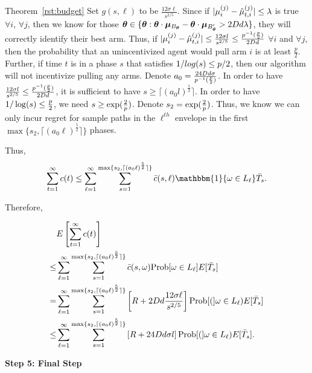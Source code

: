 \begin{extraproof}{Theorem~\ref{rst:budget}}
Set $g(s,\ell)$ to be $\frac{12\sigma \ell}{s^{2/5}}$.
Since if $|\mu_{i}^{(j)}-\hat{\mu}_{t,i}^{(j)}|\leq \lambda$ is true $\forall i$, $\forall j$, then we know for those $\bm{\theta}\in \{\bm{\theta}:\bm{\theta}\cdot \bm{\mu}_{B_{\bm{\theta}}}-\bm{\theta} \cdot \bm{\mu}_{B'_{\bm{\theta}}}> 2D d\lambda\}$, they will correctly identify their best arm. Thus, if $|\mu_{i}^{(j)}-\hat{\mu}_{t,i}^{(j)}|\leq \frac{12\sigma l}{s^{2/5}} \leq \frac{p^{-1}(\frac{p}{2})}{2D d}$ $\forall i$ and $\forall j$, then the probability that an unincentivized agent would pull arm $i$ is at least $\frac{p}{2}$. Further, if time $t$ is in a phase $s$ that satisfies $1/log(s)\leq p/2$, then our algorithm will not incentivize pulling any arms. Denote $a_0=\frac{24D d\sigma}{p^{-1}(\frac{p}{2})}$. In order to have $\frac{12\sigma l}{s^{2/5}}\leq \frac{p^{-1}(\frac{p}{2})}{2D d}$, it is sufficient to have $s\geq \lceil (a_{0} l)^\frac{5}{2} \rceil$. In order to have $1/\log(s)\leq \frac{p}{2}$, we need $s\geq \exp(\frac{2}{p})$. Denote $s_2=\exp(\frac{2}{p})$. Thus, we know we can only incur regret for sample paths \SP in the $\ell^{th}$ envelope in the first $\max\{s_2,\lceil (a_0 \ell)^\frac{5}{2} \rceil\}$ phases.

Thus,
\begin{align*}
\sum_{t=1}^{\infty}c(t)\leq\sum_{\ell=1}^{\infty}\sum_{s=1}^{\max\{s_2,\lceil (a_0 \ell)^\frac{5}{2} \rceil\}}\bar{c}(s,\ell)\mathbbm{1}\{\SP\in \Env{\ell}\}\bar{T}_{s}. 
\end{align*}

Therefore,

\begin{align*}
&E\left[\sum_{t=1}^{\infty}c(t)\right] \\
\leq &\sum_{\ell=1}^{\infty}\sum_{s=1}^{\max\{s_2,\lceil (a_0 \ell)^\frac{5}{2} \rceil\}}\bar{c}(s,\SP)\Prob{\SP \in \Env{\ell}}E[\bar{T}_{s}]  \\
=&\sum_{\ell=1}^{\infty}\sum_{s=1}^{\max\{s_2,\lceil (a_0 \ell)^\frac{5}{2} \rceil\}}\left[\MAXR+2\Diam d\frac{12\sigma \ell}{s^{2/5}}\right]\Prob(\SP\in \Env{\ell})E[\bar{T}_{s}]  \\
\leq &\sum_{\ell=1}^{\infty}\sum_{s=1}^{\max\{s_2,\lceil (a_0 \ell)^\frac{5}{2} \rceil\}}\left[\MAXR+24\Diam d\sigma l\right]\Prob(\SP\in \Env{\ell})E[\bar{T}_{s}]. 
\end{align*}

\noindent\textbf{Step 5: Final Step}


\end{extraproof}
